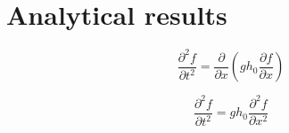 \section{Analytical results}

\begin{equation}
    \frac{\partial^2 f}{\partial t^2} = \frac{\partial}{\partial x} \left( g h_0 \frac{\partial f}{\partial x} \right)
    \label{eq:eq1}
\end{equation}

\begin{equation}
    \frac{\partial^2 f}{\partial t^2} = g h_0 \frac{\partial^2 f}{\partial x^2}
    \label{eq:eq2}
\end{equation}
